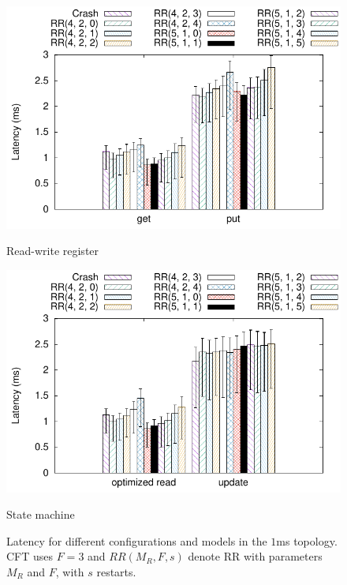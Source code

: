 \begin{figure}[t]
    \centering
    \begin{minipage}[t]{.49\linewidth}
        \includegraphics[width=\linewidth]{teem_results/protocol/1ms/parameter/reg_parameter}
        \caption{Read-write register}\label{fig:1ms_reg_lat_conf}
    \end{minipage}
    \begin{minipage}[t]{.49\linewidth}
        \includegraphics[width=\linewidth]{teem_results/protocol/1ms/parameter/smr_parameter}
        \caption{State machine}\label{fig:1ms_smr_lat_conf}
    \end{minipage}
    \caption{Latency for
    different configurations and models in the $1$ms topology. \ac{CFT} uses
    $F=3$ and $RR(M_R, F, s)$ denote \ac{RR} with parameters $M_R$ and
    $F$, with $s$ restarts.}
\end{figure}\label{fig:protocol_parameter_lat}


